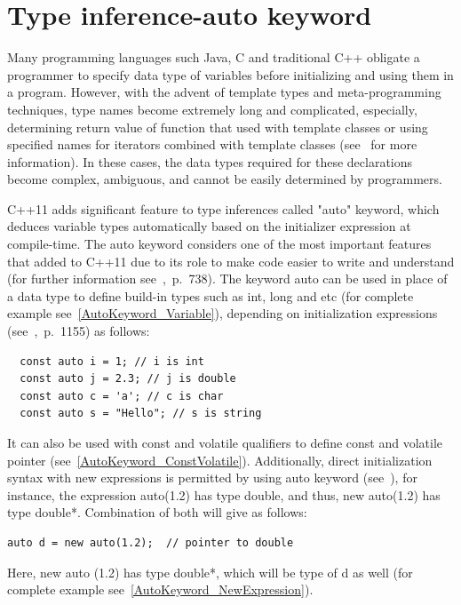 \documentclass[11pt]{report}
\begin{document}
\section{Type inference-auto keyword}
\label{section: Auto keyword}
Many programming languages such Java, C and traditional C++ obligate a programmer to specify data type of variables before initializing and using them in a program. However, with the advent of template types and meta-programming techniques, type names become extremely long and complicated, especially, determining return value of function that used with template classes or using specified names for iterators combined with template classes (see~\cite{Stroustrup:2012:Cpp11} for more information). In these cases, the data types required for these declarations become complex, ambiguous, and cannot be easily determined by programmers.

C++11 adds significant feature to type inferences called "auto" keyword, which deduces variable types automatically based on the initializer expression at compile-time. The auto keyword considers one of the most important features that added to C++11 due to its role to make code easier to write and understand (for further information see~\cite{Gregorie:professionalcpp},~p.~738). The keyword auto can be used in place of a data type to define build-in types such as int, long and etc (for complete example see~\ref{AutoKeyword_Variable}), depending on initialization expressions (see~\cite{Prata:2012:Cpp},~p.~1155) as follows: 
\begin{lstlisting}
  const auto i = 1; // i is int
  const auto j = 2.3; // j is double
  const auto c = 'a'; // c is char
  const auto s = "Hello"; // s is string
\end{lstlisting}
It can also be used with const and volatile qualifiers to define const and volatile pointer (see~\ref{AutoKeyword_ConstVolatile}). Additionally, direct initialization syntax with new expressions is permitted by using auto keyword (see~\cite{Stroustrup:2012:Cpp11}), for instance, the expression auto(1.2) has type double, and thus, new auto(1.2) has type double*. Combination of both will give as follows:
\begin{lstlisting}
auto d = new auto(1.2);  // pointer to double
\end{lstlisting}

Here, new auto (1.2) has type double*, which will be type of d as well (for complete example see~\ref{AutoKeyword_NewExpression}).
\end{document}
